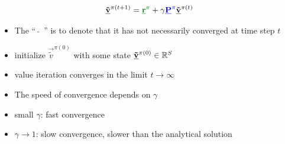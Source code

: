 \begin{frame}\frametitle{\subsubsecname}

\begin{equation}
	\vec {\tilde v}^{\pi (t+1)} = {\color{reward}\vec r^\pi} 
		+ \gamma {\color{trans}\vec P^\pi} \vec {\tilde v}^{\pi (t)} 
\end{equation}

\begin{itemize}
\item 
The ``~$\tilde{}$~'' is to denote that it has not necessarily converged 
at time step $t$
\item initialize $\vec {\tilde v}^{\pi (0)}$ with some state $\underline{\mathbf{\tilde v}}^{\pi (0)} \in \mathbb{R}^{S}$
\item value iteration converges in the limit $t \rightarrow \infty$
\item The speed of convergence depends on $\gamma$
\end{itemize}


\pause 

\begin{itemize}
\item small $\gamma$: fast convergence
\item $\gamma \rightarrow 1$: slow convergence, slower than the analytical solution
\end{itemize}

\end{frame}

